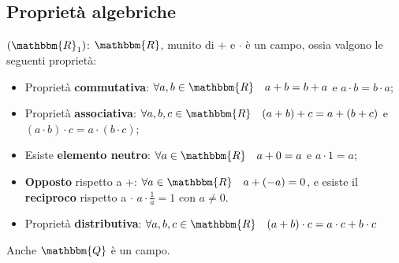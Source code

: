 \documentclass[12pt]{report}
\begin{document}
	\subsection{Proprietà algebriche}
	$(\mathbbm{R}_1)$: $\mathbbm{R}$, munito di + e $\cdot$ è un campo, ossia valgono le seguenti proprietà:
	\begin{itemize}
		\item Proprietà \textbf{commutativa}: $\forall a, b \in \mathbbm{R} \quad a+b=b+a$ e $a\cdot b = b \cdot a$;
		\item Proprietà \textbf{associativa}: $\forall a,b,c \in \mathbbm{R} \quad (a+b)+c=a+(b+c)$ e $(a\cdot b) \cdot c = a \cdot (b \cdot c)$;
		\item Esiste \textbf{elemento neutro}: $\forall a \in \mathbbm{R} \quad a + 0 = a$ e $a \cdot 1 = a$;
		\item \textbf{Opposto} rispetto a +: $\forall a \in \mathbbm{R} \quad a + (-a) = 0$, e esiste il \textbf{reciproco} rispetto a $\cdot$ $a \cdot \frac{1}{a} = 1$ con $a \neq 0$.
		\item Proprietà \textbf{distributiva}: $\forall a,b,c \in \mathbbm{R} \quad (a+b)\cdot c = a \cdot c + b \cdot c$
	\end{itemize}
	\begin{note}{}{}
		Anche $\mathbbm{Q}$ è un campo.
	\end{note}
\end{document}
